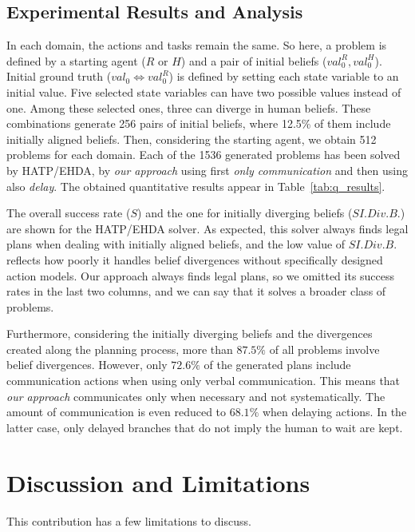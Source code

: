{\subsection{Experimental Results and Analysis}

In each domain, the actions and tasks remain the same. So here, a problem is defined by a starting agent ($R$ or $H$) and a pair of initial beliefs ($val^R_0, val^H_ 0$).
Initial ground truth ($val_0 \Leftrightarrow val^R_0$) is defined by setting each state variable to an initial value. Five selected state variables can have two possible values instead of one. Among these selected ones, three can diverge in human beliefs. These combinations generate 256 pairs of initial beliefs, where 12.5\% of them include initially aligned beliefs. Then, considering the starting agent, we obtain 512 problems for each domain. 
Each of the 1536 generated problems has been solved by HATP/EHDA, by \textit{our approach} using first \textit{only communication} and then using also \textit{delay}.
The obtained quantitative results appear in Table~\ref{tab:q_results}.
 
The overall success rate ($S$) and the one for initially diverging beliefs ($S I.Div.B.$) are shown for the HATP/EHDA solver. As expected, this solver always finds legal plans when dealing with initially aligned beliefs, and the low value of $S I.Div.B.$ reflects how poorly it handles belief divergences without specifically designed action models.
Our approach always finds legal plans, so we omitted its success rates in the last two columns, and we can say that it solves a broader class of problems.

Furthermore, considering the initially diverging beliefs and the divergences created along the planning process, more than $87.5\%$ of all problems involve belief divergences. 
However, only $72.6\%$ of the generated plans include communication actions when using only verbal communication.
This means that \textit{our approach} communicates only when necessary and not systematically. 
The amount of communication is even reduced to $68.1\%$ when delaying actions. In the latter case, only delayed branches that do not imply the human to wait are kept. 

\section{Discussion and Limitations}

This contribution has a few limitations to discuss.

}
